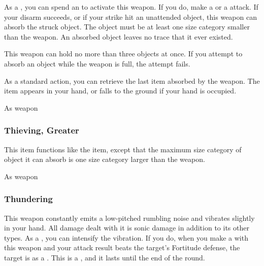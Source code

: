 As a , you can spend an  to activate this weapon.
If you do, make a  or a  attack.
If your disarm succeeds, or if your strike hit an unattended object, this weapon can absorb the struck object.
The object must be at least one size category smaller than the weapon.
An absorbed object leaves no trace that it ever existed.

This weapon can hold no more than three objects at once.
If you attempt to absorb an object while the weapon is full, the attempt fails.

As a standard action, you can retrieve the last item absorbed by the weapon.
The item appears in your hand, or falls to the ground if your hand is occupied.



 


 As weapon


\lowercase{\hypertarget{item:Thieving, Greater}{}}\label{item:Thieving, Greater}
\hypertarget{item:Thieving, Greater}{\subsubsection{Thieving, Greater\hfill{}}}

This item functions like the  item, except that the maximum size category of object it can absorb is one size category larger than the weapon.



 


 As weapon


\lowercase{\hypertarget{item:Thundering}{}}\label{item:Thundering}
\hypertarget{item:Thundering}{\subsubsection{Thundering\hfill{}}}

This weapon constantly emits a low-pitched rumbling noise and vibrates slightly in your hand.
All damage dealt with it is sonic damage in addition to its other types.
As a , you can intensify the vibration.
If you do, when you make a  with this weapon and your attack result beats the target's Fortitude defense, the target is \deafened as a .
This is a , and it lasts until the end of the round.



